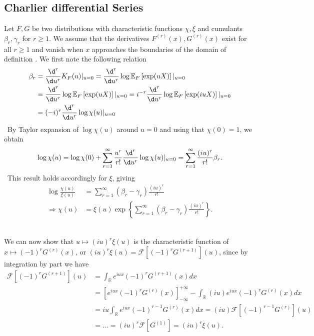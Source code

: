 \newpage

\subsection{Charlier differential Series}

Let $F, G$ be two distributions with characteristic functions $\chi, \xi$ and cumulants $\beta_r, \gamma_r$ for $r \geq 1$. We assume that the derivatives $F^{(r)}(x), G^{(r)}(x)$ exist for all $r \geq 1$ and vanish when $x$ approaches the boundaries of the domain of definition . We first note the following relation
\
\begin{align*}
    \beta_r
    &= \frac{\d^r}{\d u^r} K_F(u) |_{u=0}
    = \frac{\d^r}{\d u^r} \log \mathbb{E}_F\left[\exp(uX)\right]|_{u=0}\\
    &= \frac{\d^r}{\d u^r} \log \mathbb{E}_F\left[\exp(uX)\right]|_{u=0}
    = i^{-r}\frac{\d^r}{\d u^r} \log \mathbb{E}_F\left[\exp(iuX)\right]|_{u=0}\\
    &= (-i)^r\frac{\d^r}{\d u^r} \log \chi(u) |_{u=0}
\end{align*}
\
By Taylor expansion of $\log \chi(u)$ around $u = 0$ and using that $\chi(0) = 1$, we obtain
\begin{equation*}
    \log \chi(u)
    = \log \chi(0) + \sum_{r=1}^\infty \frac{u^r}{r!}\frac{\d^r}{\d u^r} \log \chi(u) |_{u=0}
    = \sum_{r=1}^\infty \frac{(iu)^r}{r!}\beta_r.
\end{equation*}
\
This result holds accordingly for $\xi$, giving
\begin{align*}
    \log \frac{\chi(u)}{\xi(u)} &= \sum_{r=1}^\infty (\beta_r - \gamma_r)\frac{(iu)^r}{r!}\\
\Rightarrow \chi(u) &= \xi(u) \exp\left\{\sum_{r=1}^\infty (\beta_r - \gamma_r)\frac{(iu)^r}{r!}\right\}.
\end{align*}
\

We can now show that $u \mapsto (iu)^r\xi(u)$ is the characteristic function of $x \mapsto (-1)^rG^{(r)}(x)$, or $(iu)^r\xi(u) = \mathcal{F}\left[(-1)^rG^{(r+1)}\right](u)$, since by integration by part we have
\begin{align*}
    \mathcal{F}\left[(-1)^rG^{(r+1)}\right](u)
    &= \int_{\mathbb{R}} e^{iux}(-1)^rG^{(r+1)}(x) dx \\
    &= \left[e^{iux}(-1)^rG^{(r)}(x)\right]_{-\infty}^{+\infty} - \int_{\mathbb{R}} (iu)e^{iux}(-1)^rG^{(r)}(x)dx\\
    &= iu \int_{\mathbb{R}} e^{iux}(-1)^{r-1}G^{(r)}(x) dx
    = (iu)\mathcal{F}\left[(-1)^{r-1}G^{(r)}\right](u)\\
    &= \ldots = (iu)^r\mathcal{F}\left[G^{(1)}\right] = (iu)^r \xi(u).
\end{align*}

